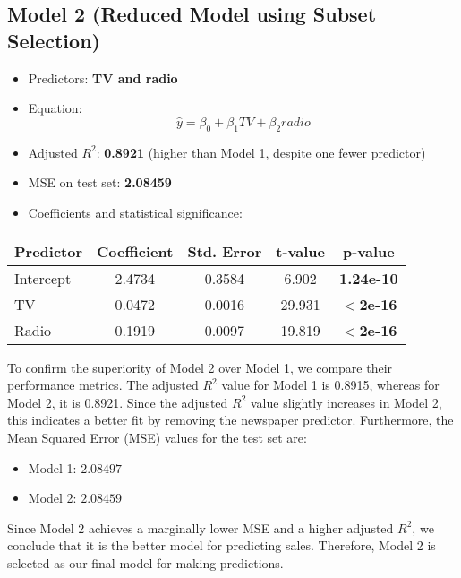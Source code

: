 \documentclass{article}
\begin{document}
\subsection{Model 2 (Reduced Model using Subset Selection)}
\begin{itemize}
    \item Predictors: \textbf{TV and radio}
    \item Equation:
    \begin{equation}
        \hat{y} = \beta_0 + \beta_1 TV + \beta_2 radio
    \end{equation}
    \item Adjusted $ R^2 $: \textbf{0.8921} (higher than Model 1, despite one fewer predictor)
    \item MSE on test set: \textbf{2.08459} 
    \item Coefficients and statistical significance:
\end{itemize}

\begin{table}[h]
    \centering
    \begin{tabular}{lcccc}
        \toprule
        Predictor  & Coefficient & Std. Error & t-value & p-value \\
        \midrule
        Intercept  & 2.4734      & 0.3584     & 6.902   & \textbf{1.24e-10} \\
        TV         & 0.0472      & 0.0016     & 29.931  & \textbf{$<$2e-16} \\
        Radio      & 0.1919      & 0.0097     & 19.819  & \textbf{$<$2e-16} \\
        \bottomrule
    \end{tabular}
\end{table}
\newpage
To confirm the superiority of Model 2 over Model 1, we compare their performance metrics. The adjusted $R^2$ value for Model 1 is 0.8915, whereas for Model 2, it is 0.8921. Since the adjusted $R^2$ value slightly increases in Model 2, this indicates a better fit by removing the newspaper predictor. Furthermore, the Mean Squared Error (MSE) values for the test set are:

\begin{itemize}
    \item Model 1: $2.08497$
    \item Model 2: $2.08459$
\end{itemize}

Since Model 2 achieves a marginally lower MSE and a higher adjusted $R^2$, we conclude that it is the better model for predicting sales. Therefore, Model 2 is selected as our final model for making predictions.
\end{document}
